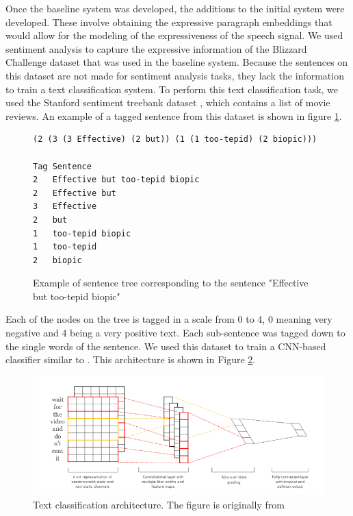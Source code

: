 Once the baseline system was developed, the additions to the initial system were developed. These involve obtaining the expressive paragraph embeddings that would allow for the modeling of the expressiveness of the speech signal. We used sentiment analysis to capture the expressive information of the Blizzard Challenge dataset that was used in the baseline system. Because the sentences on this dataset are not made for sentiment analysis tasks, they lack the information to train a text classification system. To perform this text classification task, we used the Stanford sentiment treebank dataset \cite{socher2013recursive}, which contains a list of movie reviews. An example of a tagged sentence from this dataset is shown in figure \ref{fig:tree}.

\begin{figure}[h]
    \begin{lstlisting}[basicstyle=\small,frame=single]
(2 (3 (3 Effective) (2 but)) (1 (1 too-tepid) (2 biopic)))

Tag Sentence
2   Effective but too-tepid biopic
2   Effective but
3   Effective
2   but
1   too-tepid biopic
1   too-tepid
2   biopic
    \end{lstlisting}
    \caption{Example of sentence tree corresponding to the sentence "Effective but too-tepid biopic"}
    \label{fig:tree}
\end{figure}

Each of the nodes on the tree is tagged in a scale from 0 to 4, 0 meaning very negative and 4 being a very positive text. Each sub-sentence was tagged down to the single words of the sentence. We used this dataset to train a CNN-based classifier similar to \cite{DBLP:journals/corr/Kim14f}. This architecture is shown in Figure \ref{fig:cnn-sa}.

\begin{figure}[h]
    \centering
    \includegraphics[width=15cm]{figures/cnn}
    \caption{Text classification architecture. The figure is originally from \cite{DBLP:journals/corr/Kim14f}}
    \label{fig:cnn-sa}
\end{figure}

